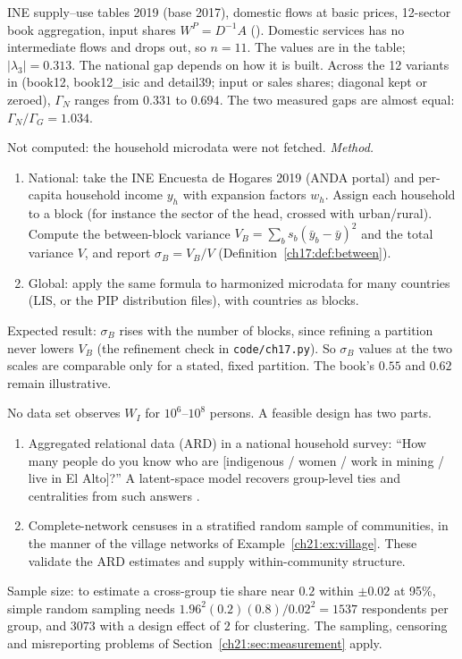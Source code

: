 \documentclass[../solutions_manual.tex]{subfiles}
\begin{document}
 INE supply--use tables 2019 (base 2017), domestic flows at basic prices, 12-sector book aggregation, input shares $W^P = D^{-1}A$ (). Domestic services has no intermediate flows and drops out, so $n = 11$. The values are in the table; $|\lambda_3| = 0.313$. The national gap depends on how it is built. Across the 12 variants in  (book12, book12\_isic and detail39; input or sales shares; diagonal kept or zeroed), $\Gamma_N$ ranges from $0.331$ to $0.694$. The two measured gaps are almost equal: $\Gamma_N/\Gamma_G = 1.034$.

 Not computed: the household microdata were not fetched. \emph{Method.}
\begin{enumerate}
\item National: take the INE Encuesta de Hogares 2019 (ANDA portal) and per-capita household income $y_h$ with expansion factors $w_h$. Assign each household to a block (for instance the sector of the head, crossed with urban/rural). Compute the between-block variance $V_B = \sum_b s_b(\bar y_b - \bar y)^2$ and the total variance $V$, and report $\sigma_B = V_B/V$ (Definition~\ref{ch17:def:between}).
\item Global: apply the same formula to harmonized microdata for many countries (LIS, or the PIP distribution files), with countries as blocks.
\end{enumerate}
Expected result: $\sigma_B$ rises with the number of blocks, since refining a partition never lowers $V_B$ (the refinement check in \texttt{code/ch17.py}). So $\sigma_B$ values at the two scales are comparable only for a stated, fixed partition. The book's $0.55$ and $0.62$ remain illustrative.

 No data set observes $W_I$ for $10^6$--$10^8$ persons. A feasible design has two parts.
\begin{enumerate}
\item Aggregated relational data (ARD) in a national household survey: ``How many people do you know who are [indigenous / women / work in mining / live in El Alto]?'' A latent-space model recovers group-level ties and centralities from such answers \citep{breza2020using}.
\item Complete-network censuses in a stratified random sample of communities, in the manner of the village networks of Example~\ref{ch21:ex:village}. These validate the ARD estimates and supply within-community structure.
\end{enumerate}
Sample size: to estimate a cross-group tie share near $0.2$ within $\pm0.02$ at 95\%, simple random sampling needs $1.96^2(0.2)(0.8)/0.02^2 = 1537$ respondents per group, and $3073$ with a design effect of $2$ for clustering. The sampling, censoring and misreporting problems of Section~\ref{ch21:sec:measurement} apply.
\end{document}
